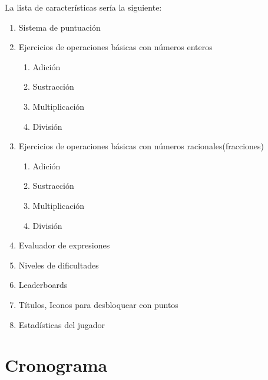 \documentclass{article}
\begin{document}
La lista de características sería la siguiente:
\begin{enumerate}
	\item Sistema de puntuación
	\item Ejercicios de operaciones básicas con números enteros
	\begin{enumerate}
		\item Adición
		\item Sustracción
		\item Multiplicación
		\item División
	\end{enumerate}
	\item Ejercicios de operaciones básicas con números racionales(fracciones)
	\begin{enumerate}
		\item Adición
		\item Sustracción
		\item Multiplicación
		\item División
	\end{enumerate}
	\item Evaluador de expresiones
	\item Niveles de dificultades
	\item Leaderboards
	\item Títulos, Iconos para desbloquear con puntos
	\item Estadísticas del jugador
\end{enumerate}

\section{Cronograma}
\end{document}
